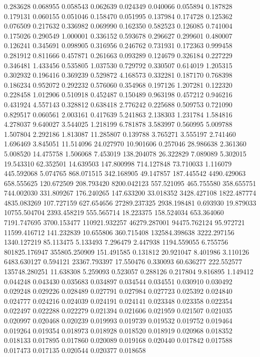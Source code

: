 0.283628
0.068955
0.058543
0.062639
0.024349
0.040066
0.055894
0.187828
0.179131
0.060155
0.051046
0.158470
0.051995
0.137984
0.174728
0.125362
0.076509
0.217632
0.336982
0.069990
0.162350
0.582523
0.126085
0.741004
0.175026
0.290549
1.000001
0.336152
0.593678
0.296627
0.299601
0.480007
0.126241
0.345691
0.098905
0.316956
0.246762
0.731931
0.172363
0.999458
0.281912
0.811666
0.457871
0.261663
0.093289
0.124679
0.326184
0.227229
0.346481
1.433456
0.535805
1.037530
0.729792
0.330507
0.614019
1.205315
0.302932
0.196416
0.369239
0.529872
4.168573
0.332281
0.187170
0.768398
0.186234
0.952072
0.292232
0.576060
0.354968
0.197126
1.207281
0.122320
0.228458
1.012906
0.510918
0.452487
0.150489
0.963198
0.457212
0.946216
0.431924
4.557143
0.328812
0.638418
2.776242
0.225688
0.509753
0.721090
0.829517
0.060561
2.003161
0.417639
5.241863
2.138303
1.231784
1.584816
4.278037
9.640027
3.544025
1.218199
6.781878
3.583997
0.560995
5.009788
1.507804
2.292186
1.813087
11.285807
0.139788
3.765271
3.555197
2.741460
1.696469
3.845051
11.514096
24.027970
10.901606
0.257046
28.986638
2.361360
5.008520
14.475758
1.506068
7.453019
138.204078
26.322829
7.089089
5.302015
19.543310
62.352501
14.639503
147.800998
714.127848
73.710033
1.116079
445.592068
5.074765
868.071515
342.168905
49.147857
187.445542
4490.429063
658.555625
120.672509
208.793420
8200.042123
557.521095
465.755580
358.655751
744.002030
331.809267
176.240265
147.633200
33.018352
3428.427108
1822.487774
4835.083269
107.727159
627.654656
27289.237325
2938.198481
0.693930
19.879033
10755.504704
2393.458219
555.565714
18.223375
158.524034
653.364060
7191.747695
3700.153477
110921.932257
46279.287001
94475.762124
95.972721
11599.416712
141.232839
10.655806
360.715408
132584.398638
3222.297156
1340.127219
85.113475
5.133493
7.296479
2.447938
1194.559055
6.755756
801825.176947
355805.250909
151.491585
0.131812
20.921047
8.401986
3.110126
6483.630127
0.594121
23367.793397
17.550476
0.330093
60.636277
222.552577
135748.280251
11.638308
5.259093
0.523057
0.288126
0.217804
9.816895
1.149412
0.044248
0.043430
0.035683
0.034897
0.034544
0.034551
0.030910
0.030492
0.029248
0.029226
0.028489
0.027791
0.027984
0.027723
0.025392
0.024840
0.024777
0.024216
0.024039
0.024191
0.024141
0.023348
0.023358
0.022354
0.022497
0.022288
0.022279
0.021394
0.021606
0.021959
0.021507
0.021035
0.020997
0.020468
0.020239
0.019993
0.019739
0.019532
0.019752
0.019464
0.019264
0.019354
0.018973
0.018928
0.018520
0.018919
0.020968
0.018352
0.018133
0.017895
0.017860
0.020089
0.019168
0.020440
0.017842
0.017588
0.017473
0.017135
0.020544
0.020377
0.018658

